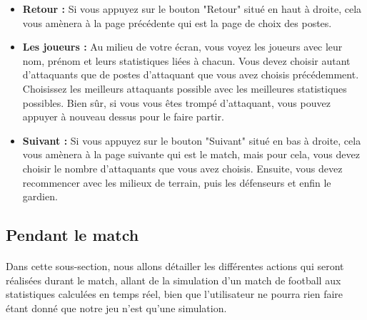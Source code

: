\begin{itemize}
    \item \textbf{Retour :} 
        Si vous appuyez sur le bouton "Retour" situé en haut à droite, cela vous amènera à la page précédente qui est la page de choix des postes.

    \vspace{15pt}

    \item \textbf{Les joueurs :} 
         Au milieu de votre écran, vous voyez les joueurs avec leur nom, prénom et leurs statistiques liées à chacun. Vous devez choisir autant d'attaquants que de postes d'attaquant que vous avez choisis précédemment. Choisissez les meilleurs attaquants possible avec les meilleures statistiques possibles. Bien sûr, si vous vous êtes trompé d'attaquant, vous pouvez appuyer à nouveau dessus pour le faire partir.

    \vspace{15pt}

    \item \textbf{Suivant :} 
        Si vous appuyez sur le bouton "Suivant" situé en bas à droite, cela vous amènera à la page suivante qui est le match, mais pour cela, vous devez choisir le nombre d'attaquants que vous avez choisis. Ensuite, vous devez recommencer avec les milieux de terrain, puis les défenseurs et enfin le gardien.
        
    \vspace{15pt}
\end{itemize}















\subsection{Pendant le match}

\paragraph{}
    Dans cette sous-section, nous allons détailler les différentes actions qui seront réalisées durant le match, allant de la simulation d'un match de football aux statistiques calculées en temps réel, bien que l'utilisateur ne pourra rien faire étant donné que notre jeu n'est qu'une simulation.

